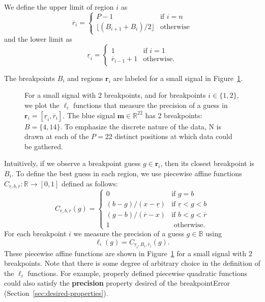 \documentclass{article}
\renewcommand{\r}{ \mathbf{ r} }
\newcommand{\rileft}[1][i]{\underline r_{#1}}
\newcommand{\riright}[1][i]{\overline r_{#1}}
\newcommand{\RR}{\mathbb{R}}
\begin{document}
We define the upper limit of region $i$ as
\begin{equation}
  \label{eq:R_i}
\riright
=
  \begin{cases}
    P-1 & \text{if } i=n \\
    \lfloor (B_{i+1}+B_i)/2 \rfloor & \text{otherwise}
  \end{cases}
\end{equation}
and
the lower limit as
\begin{equation}
  \label{eq:L_i}
  \rileft =
  \begin{cases}
    1 & \text{if } i=1 \\
    \riright[i-1]+1 & \text{otherwise}.
  \end{cases}
\end{equation}

The breakpoints $B_i$ and regions $\r_i$ are labeled for a small
signal in Figure~\ref{fig:exact_imprecision}.

\begin{figure}[H]
  \centering
  
  \vskip -0.5cm
  \caption{For a small signal with 2 breakpoints, and for breakpoints
    $i\in\{1, 2\}$, we plot the $\ell_i$ functions that measure the
    precision of a guess in $\mathbf r_i = [\underline r_i, \overline
    r_i]$.  The blue signal $\mathbf m\in\RR^{22}$ has 2 breakpoints:
    $B=\{4,14\}$. To emphasize the discrete nature of the data, N is
    drawn at each of the $P=22$ distinct positions at which data
    could be gathered.}
  \label{fig:exact_imprecision}
\end{figure}


Intuitively, if we observe a breakpoint guess $g\in \r_i$, then its
closest breakpoint is $B_i$. To define the best guess in each region,
we use piecewise affine functions $C_{\underline r,b,\overline
  r}:\RR\rightarrow[0,1]$ defined as follows:
\begin{equation}
  \label{eq:cLxR}
  C_{\underline r,b,\overline r}(g) =
  \begin{cases}
    0 & \text{if }g=b \\
    (b-g)/(x-\underline r) & \text{if } \underline r< g< b \\
    (g-b)/(\overline r-x) & \text{if } b< g< \overline r\\
    1 & \text{ otherwise}.
  \end{cases}
\end{equation}
For each breakpoint $i$ we measure the precision of a guess
$g\in\mathbb B$ using
\begin{equation}
  \label{eq:ell_i_exact}
  \ell_i(g)=C_{\rileft,B_i,\riright}(g).
\end{equation}
These piecewise affine functions are shown in
Figure~\ref{fig:exact_imprecision} for a small signal with 2
breakpoints. Note that there is some degree of arbitrary choice in the
definition of the $\ell_i$ functions. For example, properly defined
piecewise quadratic functions could also satisfy the
\textbf{precision} property desired of the breakpointError
(Section~\ref{sec:desired-properties}).
\end{document}
